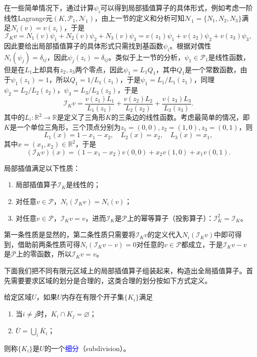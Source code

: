 \documentclass[a4paper,10pt]{ctexart}
\begin{document}
在一些简单情况下，通过计算$ \psi_i $可以得到局部插值算子的具体形式，例如考虑一阶线性Lagrange元$ (K,\mathcal{P}_1,\mathcal{N}_1) $，由上一节的定义和分析可知$ \mathcal{N}_1 = \{N_1,N_2,N_3\} $满足$ N_i(v) = v(z_i) $，于是
\[
    \mathcal{I}_K v = N_1(v)\psi_1 + N_2(v)\psi_2 + N_3(v)\psi_3 = v(z_1)\psi_1 + v(z_2)\psi_2 + v(z_3)\psi_3,
\]
因此要给出局部插值算子的具体形式只需找到基函数$ \psi_i $。根据对偶性$ N_i(\psi_j) = \delta_{ij} $，因此$ \psi_j(z_i) = \delta_{ij} $。类似于上一节的分析，$ \psi_1\in \mathcal{P}_1 $是线性函数，但是在$ L_1 $上却具有$ z_2,z_3 $两个零点，因此$ \psi_1 = L_1Q_1 $，其中$ Q_1 $是一个常数函数，由于$ \psi_1(z_1) = 1 $，所以$ Q_1 = 1 / L_1(z_1) $，于是$ \psi_1 = L_1/L_1(z_1) $，同理$ \psi_2 = L_2 / L_2(z_2) $，$ \psi_3 = L_3 / L_3(z_3) $，于是
\[
    \mathcal{I}_K v = \frac{v(z_1)L_1}{L_1(z_1)} + \frac{v(z_2)L_2}{L_2(z_2)} + \frac{v(z_3)L_3}{L_3(z_3)}.
\]
其中的$ L_i:\mathbb{R}^2\to \mathbb{R} $是定义了三角形$ K $的三条边的线性函数。考虑最简单的情况，即$ K $是一个单位三角形，三个顶点分别为$ z_1 = (0,0),z_2 = (1,0),z_3 = (0,1) $，则
\[
    L_1(x) = 1-x_1-x_2,\quad L_2(x) = x_2,\quad L_3(x) = x_1,
\]
其中$ x = (x_1,x_2)\in \mathbb{R}^2 $，于是
\[
    (\mathcal{I}_K v)(x) = (1-x_1-x_2)v(0,0) + x_2v(1,0) + x_1v(0,1).
\]

\begin{lemma}
    局部插值满足以下性质：
    \begin{enumerate}
        \item 局部插值算子$ \mathcal{I}_K $是线性的；
        \item 对任意$ v\in \mathcal{P} $，$ N_i(\mathcal{I}_K v) = N_i(v) $；
        \item 对任意$ v\in \mathcal{P} $，$ \mathcal{I}_K v = v $，进而$ \mathcal{I}_K $是$ \mathcal{P} $上的幂等算子（投影算子）：$ \mathcal{I}_K^2 = \mathcal{I}_K $。
    \end{enumerate}
\end{lemma}
\noindent 第一条性质是显然的，第二条性质只需要将$ \mathcal{I}_K v $的定义代入$ N_i(\mathcal{I}_K v) $中即可得到，借助前两条性质可得$ N_i(\mathcal{I}_K v - v)=0 $对任意的$ v\in \mathcal{P} $都成立，于是$ \mathcal{I}_K v - v $是$ \mathcal{P} $上的零函数，所以$ \mathcal{I}_K v = v $。

下面我们把不同有限元区域上的局部插值算子组装起来，构造出全局插值算子。首先需要要求区域的划分是合理的，这类合理的划分按如下方式定义。

\begin{definition}
    给定区域$ U $，如果$ U $内存在有限个开子集$ \{K_i\} $满足
    \begin{enumerate}
        \item 当$ i\ne j $时，$ K_i \cap K_j = \varnothing $；
        \item $ \overline{U} = \bigcup_i \overline{K}_i $；
    \end{enumerate}
    则称$ \{K_i\} $是$ U $的一个\textcolor{blue}{细分}（subdivision）。
\end{definition}
\end{document}
